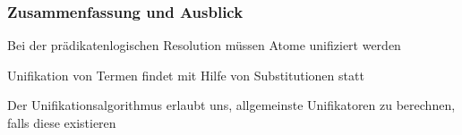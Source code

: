 \documentclass[aspectratio=1610,onlymath]{beamer}
\begin{document}
% 
% 

% 
% 
% 


\begin{frame}\frametitle{Zusammenfassung und Ausblick}

Bei der prädikatenlogischen Resolution müssen Atome unifiziert werden\bigskip

Unifikation von Termen findet mit Hilfe von Substitutionen statt
\bigskip

Der Unifikationsalgorithmus erlaubt uns, allgemeinste Unifikatoren zu berechnen, falls
diese existieren
\bigskip


\end{frame}




% 
% 
% 
% 
% 
% 
\end{document}
